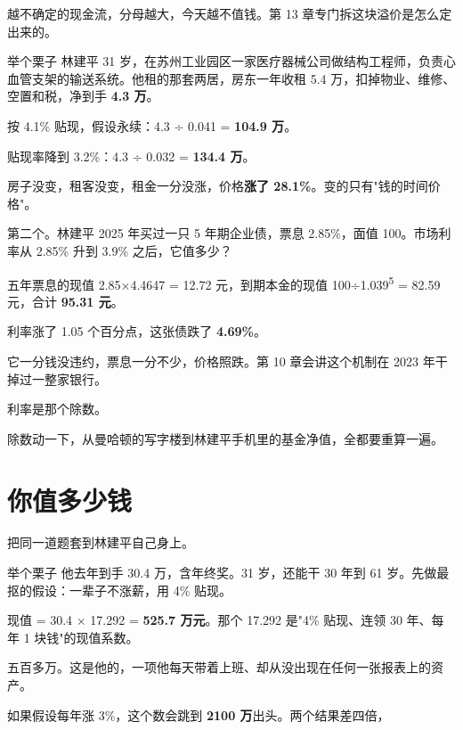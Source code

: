 越不确定的现金流，分母越大，今天越不值钱。第 13 章专门拆这块溢价是怎么定出来的。

\begin{egbox}{举个栗子}
林建平 31 岁，在苏州工业园区一家医疗器械公司做结构工程师，负责心血管支架的输送系统。他租的那套两居，房东一年收租 5.4 万，扣掉物业、维修、空置和税，净到手 \textbf{4.3 万}。

按 4.1\% 贴现，假设永续：4.3 ÷ 0.041 = \textbf{104.9 万}。

贴现率降到 3.2\%：4.3 ÷ 0.032 = \textbf{134.4 万}。

房子没变，租客没变，租金一分没涨，价格\textbf{涨了 28.1\%}。变的只有"钱的时间价格"。

第二个。林建平 2025 年买过一只 5 年期企业债，票息 2.85\%，面值 100。市场利率从 2.85\% 升到 3.9\% 之后，它值多少？

五年票息的现值 2.85×4.4647 = 12.72 元，到期本金的现值 100÷1.039\textsuperscript{5} = 82.59 元，合计 \textbf{95.31 元}。

利率涨了 1.05 个百分点，这张债跌了 \textbf{4.69\%}。

它一分钱没违约，票息一分不少，价格照跌。第 10 章会讲这个机制在 2023 年干掉过一整家银行。

\end{egbox}

利率是那个除数。

除数动一下，从曼哈顿的写字楼到林建平手机里的基金净值，全都要重算一遍。

\section{你值多少钱}

把同一道题套到林建平自己身上。

\begin{egbox}{举个栗子}
他去年到手 30.4 万，含年终奖。31 岁，还能干 30 年到 61 岁。先做最抠的假设：一辈子不涨薪，用 4\% 贴现。

现值 = 30.4 × 17.292 = \textbf{525.7 万元}。那个 17.292 是"4\% 贴现、连领 30 年、每年 1 块钱"的现值系数。

五百多万。这是他的，一项他每天带着上班、却从没出现在任何一张报表上的资产。

如果假设每年涨 3\%，这个数会跳到 \textbf{2100 万}出头。两个结果差四倍，

\end{egbox}

